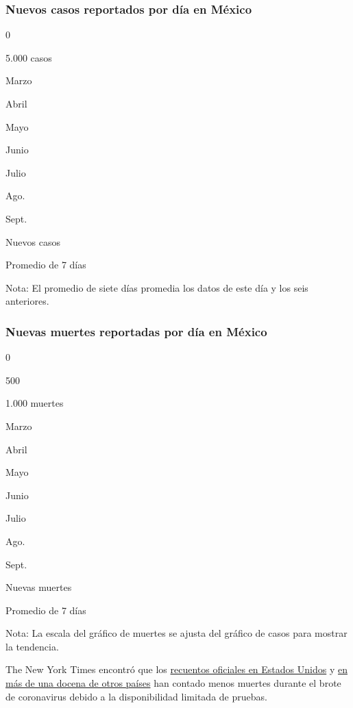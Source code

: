 \hypertarget{nuevos-casos-reportados-por-duxeda-en-muxe9xico}{%
\subsubsection{Nuevos casos reportados por día en
México}\label{nuevos-casos-reportados-por-duxeda-en-muxe9xico}}

0

5.000 casos

Marzo

Abril

Mayo

Junio

Julio

Ago.

Sept.

Nuevos casos

Promedio de 7 días

Nota: El promedio de siete días promedia los datos de este día y los
seis anteriores.

\hypertarget{nuevas-muertes-reportadas-por-duxeda-en-muxe9xico}{%
\subsubsection{Nuevas muertes reportadas por día en
México}\label{nuevas-muertes-reportadas-por-duxeda-en-muxe9xico}}

0

500

1.000 muertes

Marzo

Abril

Mayo

Junio

Julio

Ago.

Sept.

Nuevas muertes

Promedio de 7 días

Nota: La escala del gráfico de muertes se ajusta del gráfico de casos
para mostrar la tendencia.

The New York Times encontró que los
\href{https://www.nytimes3xbfgragh.onion/interactive/2020/08/12/us/covid-deaths-us.html}{recuentos
oficiales en Estados Unidos} y
\href{https://www.nytimes3xbfgragh.onion/interactive/2020/04/21/world/coronavirus-missing-deaths.html}{en
más de una docena de otros países} han contado menos muertes durante el
brote de coronavirus debido a la disponibilidad limitada de pruebas.

